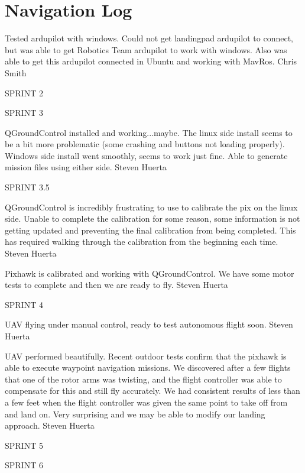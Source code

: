 \section{Navigation Log}

\begin{description}
\item [10/03/15]  Tested ardupilot with windows. Could not get landingpad ardupilot to connect, but was able to get Robotics Team ardupilot to work with windows. Also was able to get this ardupilot connected in Ubuntu and working with MavRos. \hfill{Chris Smith}


\item SPRINT 2

\item SPRINT 3

\item [11/16/15]  QGroundControl installed and working...maybe. The linux side install seems to be a bit more problematic (some crashing and buttons not loading properly). Windows side install went smoothly, seems to work just fine. Able to generate mission files using either side.  \hfill{Steven Huerta}

\item SPRINT 3.5

\item [12/21/15]  QGroundControl is incredibly frustrating to use to calibrate the pix on the linux side. Unable to complete the calibration for some reason, some information is not getting updated and preventing the final calibration from being completed. This has required walking through the calibration from the beginning each time.  \hfill{Steven Huerta}

\item [1/4/16]  Pixhawk is calibrated and working with QGroundControl. We have some motor tests to complete and then we are ready to fly. \hfill{Steven Huerta}

\item SPRINT 4

\item [1/18/16]  UAV flying under manual control, ready to test autonomous flight soon. \hfill{Steven Huerta}

\item [1/25/16]  UAV performed beautifully. Recent outdoor tests confirm that the pixhawk is able to execute waypoint navigation missions. We discovered after a few flights that one of the rotor arms was twisting, and the flight controller was able to compensate for this and still fly accurately. We had consistent results of less than a few feet when the flight controller was given the same point to take off from and land on. Very surprising and we may be able to modify our landing approach.  \hfill{Steven Huerta}

\item SPRINT 5

\item SPRINT 6
 \end{description}